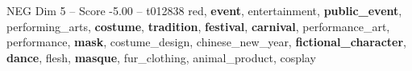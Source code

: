 \begin{textsample}{NEG Dim 5 – Score -5.00 – t012838}  \label{ex:f5_neg_040}
red, \textbf{event}, entertainment, \textbf{public\_event}, performing\_arts, \textbf{costume}, \textbf{tradition}, \textbf{festival}, \textbf{carnival}, performance\_art, performance, \textbf{mask}, costume\_design, chinese\_new\_year, \textbf{fictional\_character}, \textbf{dance}, flesh, \textbf{masque}, fur\_clothing, animal\_product, cosplay

\end{textsample}
